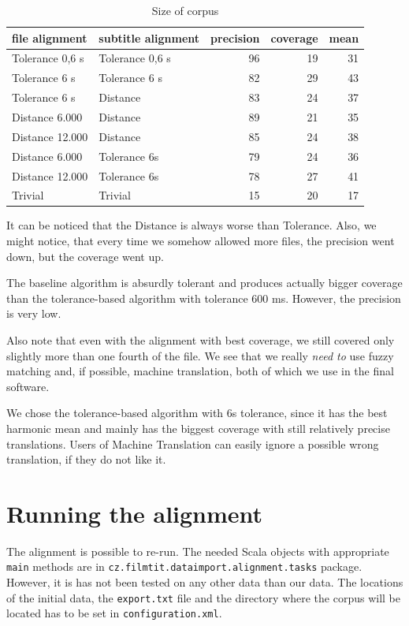 \begin{table}[h]
\begin{center}
\begin{tabular}{|l|l|r|r|r|}
    \hline
    \textbf{file alignment} & \textbf{subtitle alignment} & \textbf{precision} & \textbf{coverage} & \textbf{mean} \\ \hline
    Tolerance 0,6 s & Tolerance 0,6 s & 96  & 19  & 31 \\ \hline
    Tolerance 6 s & Tolerance 6 s & 82  & 29 & 43 \\ \hline
    Tolerance 6 s & Distance & 83 & 24 & 37 \\ \hline
    Distance 6.000 & Distance &  89 & 21 & 35 \\ \hline
    Distance 12.000 & Distance & 85 & 24 & 38 \\ \hline
    Distance 6.000 & Tolerance 6s & 79 & 24 & 36 \\ \hline
    Distance 12.000 & Tolerance 6s & 78 & 27 & 41 \\ \hline
    Trivial & Trivial & 15 & 20 & 17 \\ \hline
    
\end{tabular}
\end{center}

\caption{Size of corpus}\label{tm_simulation}
\end{table}

It can be noticed that the Distance is always worse than Tolerance. Also, we might notice, that every time we somehow allowed more files, the precision went down, but the coverage went up.

The baseline algorithm is absurdly tolerant and produces actually bigger coverage than the tolerance-based algorithm with tolerance 600 ms. However, the precision is very low.

Also note that even with the alignment with best coverage, we still covered only slightly more than one fourth of the file. We see that we really \emph{need to} use fuzzy matching and, if possible, machine translation, both of which we use in the final software.

We chose the tolerance-based algorithm with 6s tolerance, since it has the best harmonic mean and mainly has the biggest coverage with still relatively precise translations. Users of Machine Translation can easily ignore a possible wrong translation, if they do not like it.

\section{Running the alignment}
The alignment is possible to re-run. The needed Scala objects with appropriate \texttt{main} methods are in \texttt{cz.filmtit.dataimport.alignment.tasks} package. However, it is has not been tested on any other data than our data. The locations of the initial data, the \texttt{export.txt} file and the directory where the corpus will be located has to be set in \texttt{configuration.xml}.

